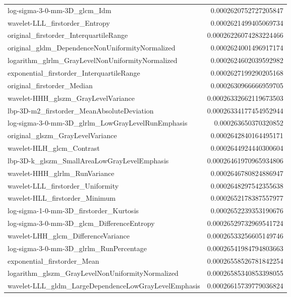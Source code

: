{\begin{xltabular}[H]{\textwidth}{X r}
        log-sigma-3-0-mm-3D\_glcm\_Idm & 0.0002620752727205847 \\
        wavelet-LLL\_firstorder\_Entropy & 0.0002621499405069734 \\
        original\_firstorder\_InterquartileRange & 0.00026226074283224466 \\
        original\_gldm\_DependenceNonUniformityNormalized & 0.0002624001496917174 \\
        logarithm\_glrlm\_GrayLevelNonUniformityNormalized & 0.0002624602039592982 \\
        exponential\_firstorder\_InterquartileRange & 0.0002627199290205168 \\
        original\_firstorder\_Median & 0.0002630966666959705 \\
        wavelet-HHH\_glszm\_GrayLevelVariance & 0.00026332662119673503 \\
        lbp-3D-m2\_firstorder\_MeanAbsoluteDeviation & 0.00026334177454952944 \\
        log-sigma-3-0-mm-3D\_glrlm\_LowGrayLevelRunEmphasis & 0.000263650370320852 \\
        original\_glszm\_GrayLevelVariance & 0.0002642840164495171 \\
        wavelet-HLH\_glcm\_Contrast & 0.0002644924440300604 \\
        lbp-3D-k\_glszm\_SmallAreaLowGrayLevelEmphasis & 0.00026461970965934806 \\
        wavelet-HHH\_glrlm\_RunVariance & 0.0002646780824886947 \\
        wavelet-LLL\_firstorder\_Uniformity & 0.0002648297542355638 \\
        wavelet-HLL\_firstorder\_Minimum & 0.0002652178387557977 \\
        log-sigma-1-0-mm-3D\_firstorder\_Kurtosis & 0.0002652239353190676 \\
        log-sigma-3-0-mm-3D\_glcm\_DifferenceEntropy & 0.00026529732969541724 \\
        wavelet-LHH\_glcm\_DifferenceVariance & 0.00026533256605149746 \\
        log-sigma-3-0-mm-3D\_glrlm\_RunPercentage & 0.00026541984794803663 \\
        exponential\_firstorder\_Mean & 0.00026558526781842254 \\
        logarithm\_glszm\_GrayLevelNonUniformityNormalized & 0.00026585340853398055 \\
        wavelet-LLL\_gldm\_LargeDependenceLowGrayLevelEmphasis & 0.00026615739779036824 \\

\end{xltabular}}
